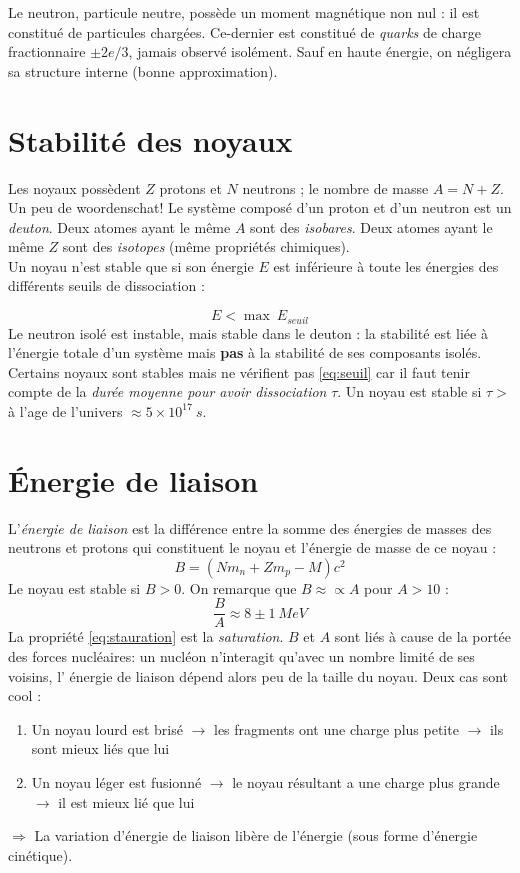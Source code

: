 \documentclass	[11pt, a4paper, openany]{book}
\begin{document}
Le neutron, particule neutre, possède un moment magnétique non nul : il est constitué de particules
chargées. Ce-dernier est constitué de \textit{quarks} de charge fractionnaire $\pm 2e/3$, jamais 
observé isolément. Sauf en haute énergie, on négligera sa structure interne (bonne approximation).

\section{Stabilité des noyaux}
Les noyaux possèdent $Z$ protons et $N$ neutrons ; le nombre de masse $A = N + Z$. Un peu de 
woordenschat! Le système composé d'un proton et d'un neutron est un \textit{deuton}. Deux atomes ayant le même 
$A$ sont des \textit{isobares}. Deux atomes ayant le même $Z$ sont des \textit{isotopes} (même 
propriétés chimiques).\\
Un noyau n'est stable que si son énergie $E$ est inférieure à toute les énergies des différents 
seuils de dissociation : 

\begin{equation}
E < \max\ E_{seuil}
\label{eq:seuil}
\end{equation}
Le neutron isolé est instable, mais stable dans le deuton : la stabilité est liée à l'énergie 
totale d'un système mais \textbf{pas} à la stabilité de ses composants isolés. \\
Certains noyaux sont stables mais ne vérifient pas \autoref{eq:seuil} car il faut tenir compte 
de la \textit{durée moyenne pour avoir dissociation} $\tau$. Un noyau est stable si $\tau >$ à
l'age de l'univers $\approx 5\times10^{17}\ s$.


\section{Énergie de liaison}
L'\textit{énergie de liaison} est la différence entre la somme des énergies de masses des neutrons 
et protons qui constituent le noyau et l'énergie de masse de ce noyau : 
\begin{equation}
B = (Nm_n + Zm_p - M)c^2
\end{equation}
Le noyau est stable si $B>0$. On remarque que $B \approx\propto A$ pour $A>10$ :
\begin{equation}
\frac{B}{A} \approx 8 \pm 1\ MeV
\label{eq:stauration}
\end{equation}
La propriété \autoref{eq:stauration} est la \textit{saturation}. $B$ et $A$ sont liés à cause de la 
portée des forces nucléaires: un nucléon n’interagit qu'avec un nombre limité de ses voisins, l'
énergie de liaison dépend alors peu de la taille du noyau. Deux cas sont cool :
\begin{enumerate}
\item Un noyau lourd est brisé $\rightarrow$ les fragments ont une charge plus petite $\rightarrow$ ils
sont mieux liés que lui
\item Un noyau léger est fusionné $\rightarrow$ le noyau résultant a une charge plus grande$\rightarrow$
il est mieux lié que lui
\end{enumerate}
$\Rightarrow$ La variation d'énergie de liaison libère de l'énergie (sous forme d'énergie cinétique).
\end{document}
